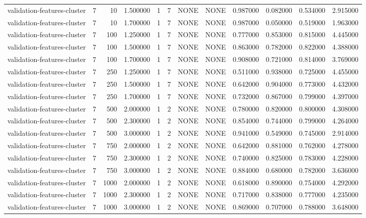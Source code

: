 \begin{tabular}{lrrrllllrrrr}
validation-features-cluster & 7 & 10 & 1.500000 & 1 & 7 & NONE & NONE & 0.987000 & 0.082000 & 0.534000 & 2.915000 \\
validation-features-cluster & 7 & 10 & 1.700000 & 1 & 7 & NONE & NONE & 0.987000 & 0.050000 & 0.519000 & 1.963000 \\
validation-features-cluster & 7 & 100 & 1.250000 & 1 & 7 & NONE & NONE & 0.777000 & 0.853000 & 0.815000 & 4.445000 \\
validation-features-cluster & 7 & 100 & 1.500000 & 1 & 7 & NONE & NONE & 0.863000 & 0.782000 & 0.822000 & 4.388000 \\
validation-features-cluster & 7 & 100 & 1.700000 & 1 & 7 & NONE & NONE & 0.908000 & 0.721000 & 0.814000 & 3.769000 \\
validation-features-cluster & 7 & 250 & 1.250000 & 1 & 7 & NONE & NONE & 0.511000 & 0.938000 & 0.725000 & 4.455000 \\
validation-features-cluster & 7 & 250 & 1.500000 & 1 & 7 & NONE & NONE & 0.642000 & 0.904000 & 0.773000 & 4.432000 \\
validation-features-cluster & 7 & 250 & 1.700000 & 1 & 7 & NONE & NONE & 0.732000 & 0.867000 & 0.799000 & 4.397000 \\
validation-features-cluster & 7 & 500 & 2.000000 & 1 & 2 & NONE & NONE & 0.780000 & 0.820000 & 0.800000 & 4.308000 \\
validation-features-cluster & 7 & 500 & 2.300000 & 1 & 2 & NONE & NONE & 0.854000 & 0.744000 & 0.799000 & 4.264000 \\
validation-features-cluster & 7 & 500 & 3.000000 & 1 & 2 & NONE & NONE & 0.941000 & 0.549000 & 0.745000 & 2.914000 \\
validation-features-cluster & 7 & 750 & 2.000000 & 1 & 2 & NONE & NONE & 0.642000 & 0.881000 & 0.762000 & 4.278000 \\
validation-features-cluster & 7 & 750 & 2.300000 & 1 & 2 & NONE & NONE & 0.740000 & 0.825000 & 0.783000 & 4.228000 \\
validation-features-cluster & 7 & 750 & 3.000000 & 1 & 2 & NONE & NONE & 0.884000 & 0.680000 & 0.782000 & 3.636000 \\
validation-features-cluster & 7 & 1000 & 2.000000 & 1 & 2 & NONE & NONE & 0.618000 & 0.890000 & 0.754000 & 4.292000 \\
validation-features-cluster & 7 & 1000 & 2.300000 & 1 & 2 & NONE & NONE & 0.717000 & 0.838000 & 0.777000 & 4.235000 \\
validation-features-cluster & 7 & 1000 & 3.000000 & 1 & 2 & NONE & NONE & 0.869000 & 0.707000 & 0.788000 & 3.648000 \\

\end{tabular}
